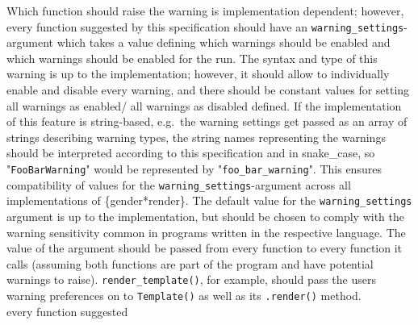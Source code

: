 \documentclass{article}
\begin{document}
    Which function should raise the warning is implementation dependent;
    however, every function suggested by this specification should have an \texttt{warning\_settings}-argument which takes a value defining which warnings should be enabled and which warnings should be enabled for the run.
    The syntax and type of this warning is up to the implementation;
    however, it should allow to individually enable and disable every warning, and there should be constant values for setting all warnings as enabled/ all warnings as disabled defined.
    If the implementation of this feature is string-based, e.g.\ the warning settings get passed as an array of strings describing warning types, the string names representing the warnings should be interpreted according to this specification and in snake\_case, so "\texttt{FooBarWarning}" would be represented by  "\texttt{foo\_bar\_warning}".
    This ensures compatibility of values for the \texttt{warning\_settings}-argument across all implementations of \{gender*render\}.
    The default value for the \texttt{warning\_settings} argument is up to the implementation, but should be chosen to comply with the warning sensitivity common in programs written in the respective language.
    The value of the argument should be passed from every function to every function it calls (assuming both functions are part of the program and have potential warnings to raise).
    \texttt{render\_template()}, for example, should pass the users warning preferences on to \texttt{Template()} as well as its \texttt{.render()} method.\\
every function suggested
\end{document}
